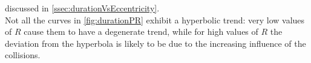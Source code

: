 discussed in \ref{ssec:durationVsEccentricity}.\\
\newpage
Not all the curves in \ref{fig:durationPR} exhibit a hyperbolic trend: very low
values of $R$ cause them to have a degenerate trend, while for high values of
$R$ the deviation from the hyperbola is likely to be due to the increasing
influence of the collisions.
%
